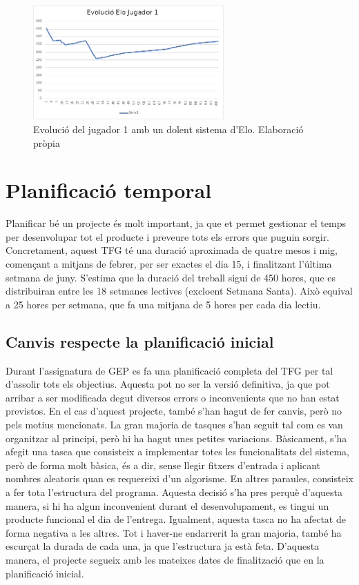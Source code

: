 \documentclass[a4paper]{article}
\begin{document}
\begin{figure}[H]
    \centering
    \includegraphics[width=0.65\textwidth]{images/PlayerEloDolent.png}
    \caption{Evolució del jugador 1 amb un dolent sistema d'Elo. Elaboració pròpia}
    \label{fig:BadElo}
\end{figure}

\newpage
\section{Planificació temporal}
Planificar bé un projecte és molt important, ja que et permet gestionar el temps per desenvolupar tot el producte i preveure tots els errors que puguin sorgir. Concretament, aquest TFG té una duració aproximada de quatre mesos i mig, començant a mitjans de febrer, per ser exactes el dia 15, i finalitzant l'última setmana de juny. S'estima que la duració del treball sigui de 450 hores, que es distribuiran entre les 18 setmanes lectives (excloent Setmana Santa). Això equival a 25 hores per setmana, que fa una mitjana de 5 hores per cada dia lectiu. 

\subsection{Canvis respecte la planificació inicial}

Durant l'assignatura de GEP es fa una planificació completa del TFG per tal d'assolir tots els objectius. Aquesta pot no ser la versió definitiva, ja que pot arribar a ser modificada degut diversos errors o inconvenients que no han estat previstos. En el cas d'aquest projecte, també s'han hagut de fer canvis, però no pels motius mencionats. La gran majoria de tasques s'han seguit tal com es van organitzar al principi, però hi ha hagut unes petites variacions. Bàsicament, s'ha afegit una tasca que consisteix a implementar totes les funcionalitats del sistema, però de forma molt bàsica, és a dir, sense llegir fitxers d'entrada i aplicant nombres aleatoris quan es requereixi d'un algorisme. En altres paraules, consisteix a fer tota l'estructura del programa. Aquesta decisió s'ha pres perquè d'aquesta manera, si hi ha algun inconvenient durant el desenvolupament, es tingui un producte funcional el dia de l'entrega. Igualment, aquesta tasca no ha afectat de forma negativa a les altres. Tot i haver-ne endarrerit la gran majoria, també ha escurçat la durada de cada una, ja que l'estructura ja està feta. D'aquesta manera, el projecte segueix amb les mateixes dates de finalització que en la planificació inicial.
\end{document}
